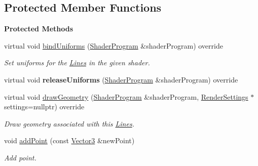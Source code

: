 \subsection*{Protected Member Functions}
\begin{Indent}\textbf{ Protected Methods}\par
\begin{DoxyCompactItemize}
\item 
\mbox{\label{classrev_1_1_lines_af38c86cc7a5f11fc0627c22a5b55610a}} 
virtual void \mbox{\hyperlink{classrev_1_1_lines_af38c86cc7a5f11fc0627c22a5b55610a}{bind\+Uniforms}} (\mbox{\hyperlink{classrev_1_1_shader_program}{Shader\+Program}} \&shader\+Program) override
\begin{DoxyCompactList}\small\item\em Set uniforms for the \mbox{\hyperlink{classrev_1_1_lines}{Lines}} in the given shader. \end{DoxyCompactList}\item 
\mbox{\label{classrev_1_1_lines_aad8396022d3185b9987210aea646811c}} 
virtual void {\bfseries release\+Uniforms} (\mbox{\hyperlink{classrev_1_1_shader_program}{Shader\+Program}} \&shader\+Program) override
\item 
\mbox{\label{classrev_1_1_lines_a213a0648e65c0f7de5c174e7c9ab8628}} 
virtual void \mbox{\hyperlink{classrev_1_1_lines_a213a0648e65c0f7de5c174e7c9ab8628}{draw\+Geometry}} (\mbox{\hyperlink{classrev_1_1_shader_program}{Shader\+Program}} \&shader\+Program, \mbox{\hyperlink{classrev_1_1_render_settings}{Render\+Settings}} $\ast$settings=nullptr) override
\begin{DoxyCompactList}\small\item\em Draw geometry associated with this \mbox{\hyperlink{classrev_1_1_lines}{Lines}}. \end{DoxyCompactList}\item 
\mbox{\label{classrev_1_1_lines_a1bc7a28df7642ff1ddee9f1c07788070}} 
void \mbox{\hyperlink{classrev_1_1_lines_a1bc7a28df7642ff1ddee9f1c07788070}{add\+Point}} (const \mbox{\hyperlink{classrev_1_1_vector}{Vector3}} \&new\+Point)
\begin{DoxyCompactList}\small\item\em Add point. \end{DoxyCompactList}\item 

\end{DoxyCompactItemize}
\end{Indent}
